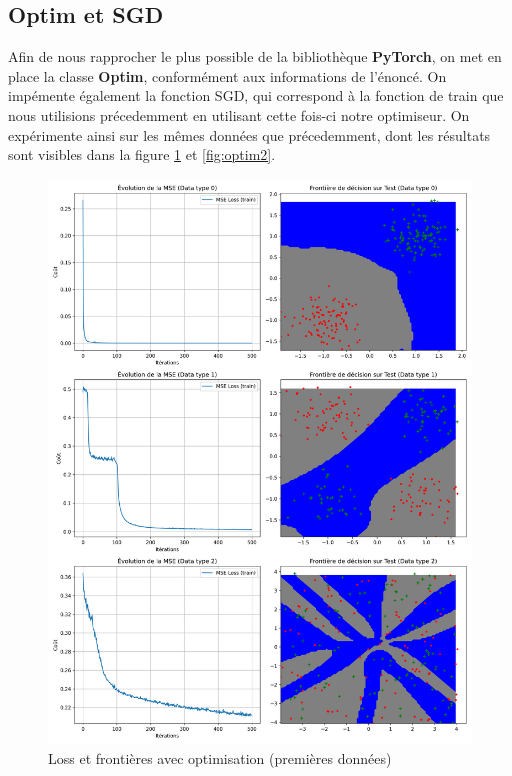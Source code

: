 \documentclass{article}
\begin{document}
\subsection{Optim et SGD}
Afin de nous rapprocher le plus possible de la bibliothèque \textbf{PyTorch}, on met en place la classe \textbf{Optim}, conformément aux informations de l'énoncé. On impémente également la fonction SGD, qui correspond à la fonction de train que nous utilisions précedemment en utilisant cette fois-ci notre optimiseur.
On expérimente ainsi sur les mêmes données que précedemment, dont les résultats sont visibles dans la figure \ref{fig:optim1} et \ref{fig:optim2}.
\begin{figure}[H]
    \centering
    \includegraphics[width=0.8\linewidth]{Images/optim1.png}
    \caption{Loss et frontières avec optimisation  (premières données)}
	\label{fig:optim1}
\end{figure}
\end{document}

